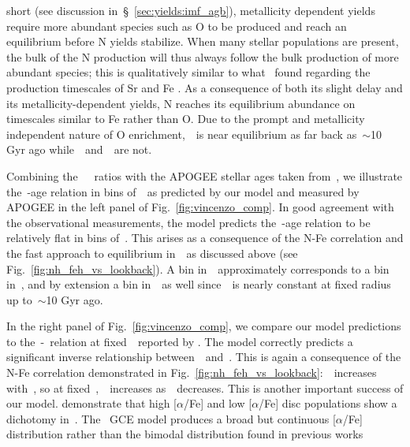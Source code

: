 \documentclass[ms.tex]{subfiles}
\begin{document}
short (see discussion in~\S~\ref{sec:yields:imf_agb}), metallicity dependent
yields require more abundant species such as O to be produced and reach an
equilibrium before N yields stabilize.
When many stellar populations are present, the bulk of the N production will
thus always follow the bulk production of more abundant species; this is 
qualitatively similar to what~\citet{Johnson2020} found regarding the
production timescales of Sr and Fe
{\color{red} \citep[see also][]{Tinsley1979}}.
As a consequence of both its slight delay and its metallicity-dependent
yields, N reaches its equilibrium abundance on timescales similar to Fe rather
than O.
Due to the prompt and metallicity independent nature of O enrichment,~\oh~is
near equilibrium as far back as~$\sim$10 Gyr ago while~\nh~and~\feh~are not.
\par
Combining the~\citet{Vincenzo2021}~\no~ratios with the APOGEE stellar ages
taken from~\citet{Miglio2021}, we illustrate the~\no-age relation in bins
of~\feh~as predicted by our model and measured by APOGEE in the left panel of
Fig.~\ref{fig:vincenzo_comp}.
In good agreement with the observational measurements, the model predicts
the~\no-age relation to be relatively flat in bins of~\feh.
This arises as a consequence of the N-Fe correlation and the fast approach to
equilibrium in~\oh~as discussed above (see Fig.~\ref{fig:nh_feh_vs_lookback}).
A bin in~\feh~approximately corresponds to a bin in~\nh, and by extension a bin
in~\no~as well since~\oh~is nearly constant at fixed radius up to~$\sim$10 Gyr
ago.
\par
In the right panel of Fig.~\ref{fig:vincenzo_comp}, we compare our model
predictions to the~\no-\ofe~relation at fixed~\oh~reported by
\citet{Vincenzo2021}.
The model correctly predicts a significant inverse relationship
between~\no~and~\ofe.
This is again a consequence of the N-Fe correlation demonstrated in
Fig.~\ref{fig:nh_feh_vs_lookback}:~\nh~increases with~\feh, so at
fixed~\oh,~\no~increases as~\ofe~decreases.
This is another important success of our model.
\citet{Vincenzo2021} demonstrate that high [$\alpha$/Fe] and low [$\alpha$/Fe]
disc populations show a dichotomy in~\no.
The~\citet{Johnson2021} GCE model produces a broad but continuous [$\alpha$/Fe]
distribution rather than the bimodal distribution found in previous works
\end{document}
